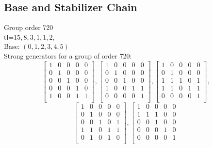 \subsection*{Base and Stabilizer Chain}
Group order 720\\
tl=$15, 8, 3, 1, 1, 2, $\\
Base: $( 0, 1, 2, 3, 4, 5 )$\\
{\small\arraycolsep=2pt
Strong generators for a group of order 720:
$$
\left[
\begin{array}{*{5}{r}}
1 & 0 & 0 & 0 & 0\\
0 & 1 & 0 & 0 & 0\\
0 & 0 & 1 & 0 & 0\\
0 & 0 & 0 & 1 & 0\\
1 & 0 & 0 & 1 & 1\\
\end{array}
\right]
, 
\left[
\begin{array}{*{5}{r}}
1 & 0 & 0 & 0 & 0\\
0 & 1 & 0 & 0 & 0\\
0 & 0 & 1 & 0 & 0\\
1 & 0 & 0 & 1 & 1\\
0 & 0 & 0 & 0 & 1\\
\end{array}
\right]
, 
\left[
\begin{array}{*{5}{r}}
1 & 0 & 0 & 0 & 0\\
0 & 1 & 0 & 0 & 0\\
1 & 1 & 1 & 0 & 1\\
1 & 1 & 0 & 1 & 1\\
0 & 0 & 0 & 0 & 1\\
\end{array}
\right]
, 
$$
$$
\left[
\begin{array}{*{5}{r}}
1 & 0 & 0 & 0 & 0\\
0 & 1 & 0 & 0 & 0\\
0 & 0 & 1 & 0 & 1\\
1 & 1 & 0 & 1 & 1\\
0 & 1 & 0 & 1 & 0\\
\end{array}
\right]
, 
\left[
\begin{array}{*{5}{r}}
1 & 0 & 0 & 0 & 0\\
1 & 1 & 1 & 0 & 0\\
0 & 0 & 1 & 0 & 0\\
0 & 0 & 0 & 1 & 0\\
0 & 0 & 0 & 0 & 1\\
\end{array}
$$}
